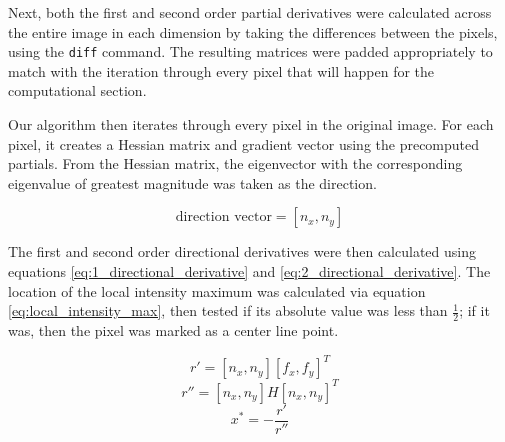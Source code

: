 \documentclass{article}
\begin{document}
Next, both the first and second order partial derivatives were calculated across the entire image in each dimension by taking the differences between the pixels, using the \texttt{diff} command. The resulting matrices were padded appropriately to match with the iteration through every pixel that will happen for the computational section.

Our algorithm then iterates through every pixel in the original image. For each pixel, it creates a Hessian matrix and gradient vector using the precomputed partials. From the Hessian matrix, the eigenvector with the corresponding eigenvalue of greatest magnitude was taken as the direction.

\begin{equation}
\text{direction vector} = [n_x, n_y]
\label{eq:direction}
\end{equation}

The first and second order directional derivatives were then calculated using equations \ref{eq:1_directional_derivative} and \ref{eq:2_directional_derivative}. The location of the local intensity maximum was calculated via equation \ref{eq:local_intensity_max}, then tested if its absolute value was less than $\frac{1}{2}$; if it was, then the pixel was marked as a center line point.

\begin{equation}
r' = [n_x,n_y][f_x,f_y]^T
\label{eq:1_directional_derivative}
\end{equation}
\begin{equation}
r'' = [n_x,n_y]H[n_x,n_y]^T
\label{eq:2_directional_derivative}
\end{equation}
\begin{equation}
x^* = -\frac{r'}{r''}
\label{eq:local_intensity_max}
\end{equation}
\end{document}
